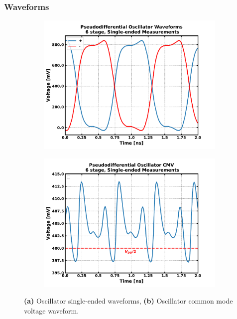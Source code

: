 	\subsubsection{Waveforms}
			\begin{figure}[htb!]
			    \centering
			    \begin{subfigure}{0.5\textwidth}
			        \centering
			        \includegraphics[width=1\textwidth, angle=0]{./figs/results/osc_se_waves}
			        \caption{ }
			        \label{fig:osc_se_waves}
			    \end{subfigure}%
			    \begin{subfigure}{0.5\textwidth}
			        \centering
			        \includegraphics[width=1\textwidth, angle=0]{./figs/results/osc_cmv}
			        \caption{ }
			        \label{fig:osc_cmv}
			    \end{subfigure}
			    \label{fig:osc_waves}
			    \caption{\textbf{(a)} Oscillator single-ended waveforms, \textbf{(b)} Oscillator common mode voltage waveform.}
			\end{figure} 
	\FloatBarrier
\FloatBarrier
